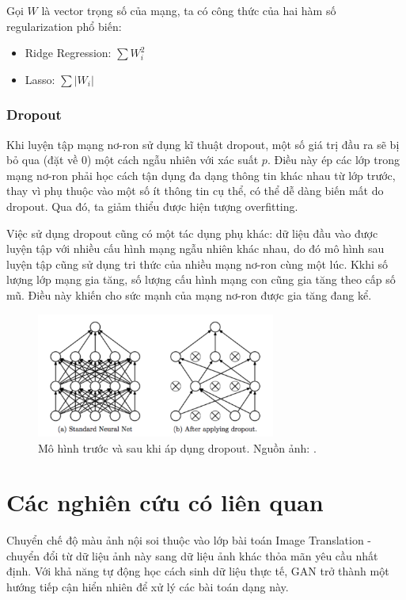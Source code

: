 \documentclass[12pt]{extreport}
\begin{document}
Gọi $ W $ là vector trọng số của mạng, ta có công thức của hai hàm số regularization phổ biến:

\begin{itemize}
    \item Ridge Regression: $ \sum W_i^2 $
    \item Lasso: $ \sum |W_i| $
\end{itemize}

\subsubsection{Dropout}

Khi luyện tập mạng nơ-ron sử dụng kĩ thuật dropout, một số giá trị đầu ra sẽ bị bỏ qua (đặt về 0) một cách ngẫu nhiên với xác suất $ p $. Điều này ép các lớp trong mạng nơ-ron phải học cách tận dụng đa dạng thông tin khác nhau từ lớp trước, thay vì phụ thuộc vào một số ít thông tin cụ thể, có thể dễ dàng biến mất do dropout. Qua đó, ta giảm thiểu được hiện tượng overfitting.

Việc sử dụng dropout cũng có một tác dụng phụ khác: dữ liệu đầu vào được luyện tập với nhiều cấu hình mạng ngẫu nhiên khác nhau, do đó mô hình sau luyện tập cũng sử dụng tri thức của nhiều mạng nơ-ron cùng một lúc. Kkhi số lượng lớp mạng gia tăng, số lượng cấu hình mạng con cũng gia tăng theo cấp số mũ. Điều này khiến cho sức mạnh của mạng nơ-ron được gia tăng đang kể.

\begin{figure}[H]
    \centering
    \includegraphics[width=0.7\textwidth]{figure3}
    \caption{Mô hình trước và sau khi áp dụng dropout. Nguồn ảnh: \cite{JMLR:v15:srivastava14a}.}
\end{figure}

\section{Các nghiên cứu có liên quan}

Chuyển chế độ màu ảnh nội soi thuộc vào lớp bài toán Image Translation - chuyển đổi từ dữ liệu ảnh này sang dữ liệu ảnh khác thỏa mãn yêu cầu nhất định. Với khả năng tự động học cách sinh dữ liệu thực tế, GAN trở thành một hướng tiếp cận hiển nhiên để xử lý các bài toán dạng này.
\end{document}
